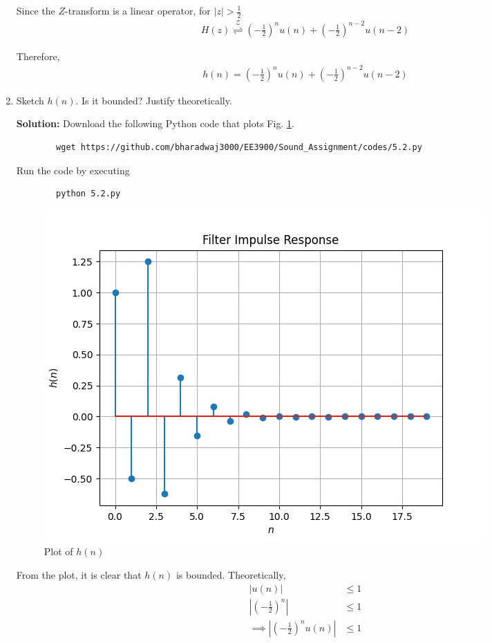 \documentclass[journal,12pt,twocolumn]{IEEEtran}
\newcommand{\solution}{\noindent \textbf{Solution: }}
\providecommand{\brak}[1]{\ensuremath{\left(#1\right)}}
\providecommand{\abs}[1]{\left\vert#1\right\vert}
\providecommand{\ztrans}{\overset{\mathcal{Z}}{ \rightleftharpoons}}
\numberwithin{equation}{section}
\renewcommand\thesection{\arabic{section}}
\begin{document}
\begin{enumerate}[label=\thesection.\arabic*]
	Since the $Z$-transform is a linear operator, for $\abs{z} > \frac12$
	\begin{align}
		H(z) \ztrans \brak{-\frac12}^n u(n) + \brak{-\frac12}^{n-2} u(n-2)
	\end{align}
	
	Therefore, 
	\begin{align}
		h(n) = \brak{-\frac12}^n u(n) + \brak{-\frac12}^{n-2} u(n-2)
	\end{align}
	
	\item Sketch $h(n)$. Is it bounded? Justify theoretically.
	
	\solution Download the following Python code that plots Fig. \ref{fig-5.2}.
	\begin{lstlisting}
		wget https://github.com/bharadwaj3000/EE3900/Sound_Assignment/codes/5.2.py
	\end{lstlisting}
	
	Run the code by executing
	\begin{lstlisting}
		python 5.2.py
	\end{lstlisting}

	\begin{figure}[!ht]
		\centering
		\includegraphics[width=\columnwidth]{./figs/5.2.png}
		\caption{Plot of $h(n)$}
		\label{fig-5.2}	
	\end{figure} 
	
	From the plot, it is clear that $h(n)$ is bounded. Theoretically,
	\begin{align}
		\abs{u(n)} &\le 1 \\
		\abs{\brak{-\frac12}^n} &\le 1 \\
		\implies \abs{\brak{-\frac12}^n u(n)} &\le 1
	\end{align}
	

\end{enumerate}
\end{document}
